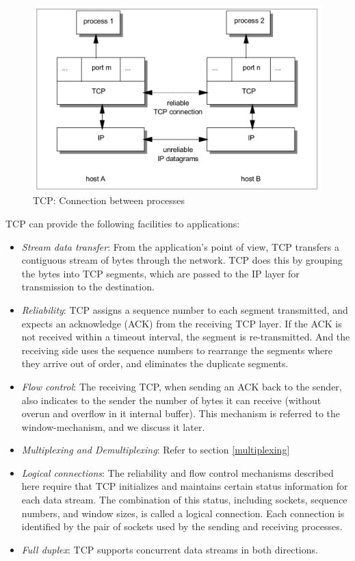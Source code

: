 \documentclass[a4paper, 11pt]{article}
\begin{document}
\begin{figure}[h]
\includegraphics[scale=0.6]{tcp-connection.png}
\caption{TCP: Connection between processes}
\label{fig:tcp-connection-oriented}
\end{figure}

TCP can provide the following facilities to applications:

\begin{itemize}
\item \textit{Stream data transfer}: From the application's point of view, TCP transfers a contiguous stream of bytes through the network. TCP does this by grouping the bytes into TCP segments, which are passed to the IP layer for transmission to the destination.
\item \textit{Reliability}: TCP assigns a sequence number to each segment transmitted, and expects an acknowledge (ACK) from the receiving TCP layer. If the ACK is not received within a timeout interval, the segment is re-transmitted. And the receiving side uses the sequence numbers to rearrange the segments where they arrive out of order, and eliminates the duplicate segments.
\item \textit{Flow control}: The receiving TCP, when sending an ACK back to the sender, also indicates to the sender the number of bytes it can receive (without overun and overflow in it internal buffer). This mechanism is referred to the window-mechanism, and we discuss it later.
\item \textit{Multiplexing and Demultiplexing}: Refer to section \ref{multiplexing}
\item \textit{Logical connections}: The reliability and flow control mechanisms described here require that TCP initializes and maintains certain status information for each data stream. The combination of this status, including sockets, sequence numbers, and window sizes, is called a logical connection. Each connection is identified by the pair of sockets used by the sending and receiving processes.
\item \textit{Full duplex}: TCP supports concurrent data streams in both directions.
\end{itemize}
\end{document}
